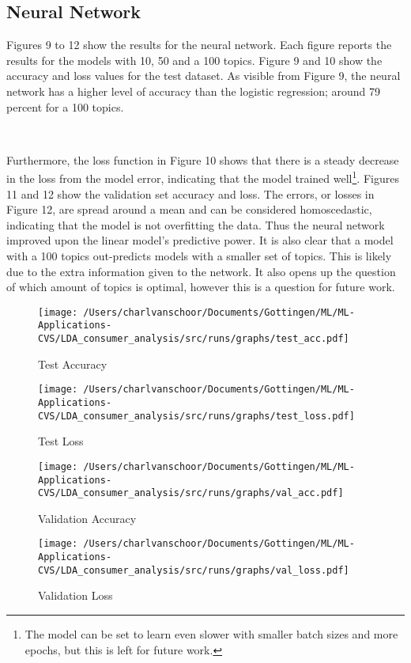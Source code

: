 \subsection{Neural Network} %
\label{sub:neural_network}

Figures 9 to 12 show the results for the neural network. Each figure reports the results for the models with 10, 50 and a 100 topics. Figure 9 and 10 show the accuracy and loss values for the test dataset. As visible from Figure 9, the neural network has a higher level of accuracy than the logistic regression; around 79 percent for a 100 topics. 

\

Furthermore, the loss function in Figure 10 shows that there is a steady decrease in the loss from the model error, indicating that the model trained well\footnote{The model can be set to learn even slower with smaller batch sizes and more epochs, but this is left for future work.}. Figures 11 and 12 show the validation set accuracy and loss. The errors, or losses in Figure 12, are spread around a mean and can be considered homoscedastic, indicating that the model is not overfitting the data. Thus the neural network improved upon the linear model's predictive power. It is also clear that a model with a 100 topics out-predicts models with a smaller set of topics. This is likely due to the extra information given to the network. It also opens up the question of which amount of topics is optimal, however this is a question for future work.

\begin{figure}[!h]
\caption{Test Accuracy}\centering
\texttt{[image: /Users/charlvanschoor/Documents/Gottingen/ML/ML-Applications-CVS/LDA\_consumer\_analysis/src/runs/graphs/test\_acc.pdf]}
\end{figure}


\begin{figure}[!h]
\caption{Test Loss}\centering
\texttt{[image: /Users/charlvanschoor/Documents/Gottingen/ML/ML-Applications-CVS/LDA\_consumer\_analysis/src/runs/graphs/test\_loss.pdf]}
\end{figure}


\begin{figure}[!h]
\caption{Validation Accuracy}\centering
\texttt{[image: /Users/charlvanschoor/Documents/Gottingen/ML/ML-Applications-CVS/LDA\_consumer\_analysis/src/runs/graphs/val\_acc.pdf]}
\end{figure}


\begin{figure}[!h]
\caption{Validation Loss}\centering
\texttt{[image: /Users/charlvanschoor/Documents/Gottingen/ML/ML-Applications-CVS/LDA\_consumer\_analysis/src/runs/graphs/val\_loss.pdf]}
\end{figure}


